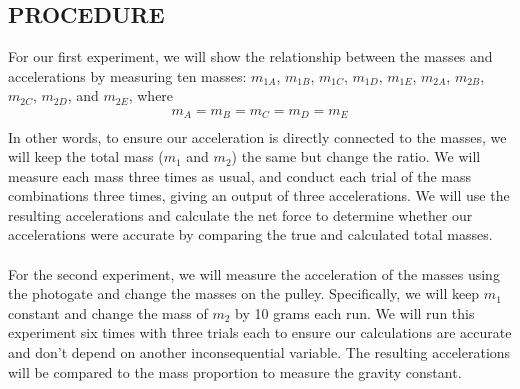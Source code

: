 \documentclass [12pt, letterpaper, twoside] {article}
\begin{document}
\subsection* {PROCEDURE}
For our first experiment, we will show the relationship between the masses and accelerations by measuring ten masses: \(m_{1A}\), \(m_{1B}\), \(m_{1C}\), \(m_{1D}\), \(m_{1E}\), \(m_{2A}\), \(m_{2B}\), \(m_{2C}\), \(m_{2D}\), and \(m_{2E}\), where
\begin {equation*}
  \begin {split}
    m_{A} = m_{B} = m_{C} = m_{D} = m_{E} \\
  \end {split}
\end {equation*}
In other words, to ensure our acceleration is directly connected to the masses, we will keep the total mass (\(m_{1}\) and \(m_{2}\)) the same but change the ratio. We will measure each mass three times as usual, and conduct each trial of the mass combinations three times, giving an output of three accelerations. We will use the resulting accelerations and calculate the net force to determine whether our accelerations were accurate by comparing the true and calculated total masses. \\\\
For the second experiment, we will measure the acceleration of the masses using the photogate and change the masses on the pulley. Specifically, we will keep \(m_{1}\) constant and change the mass of \(m_{2}\) by 10 grams each run. We will run this experiment six times with three trials each to ensure our calculations are accurate and don't depend on another inconsequential variable. The resulting accelerations will be compared to the mass proportion to measure the gravity constant.
\end{document}
